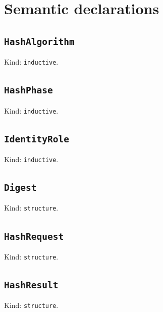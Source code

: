 \documentclass[11pt]{article}
\begin{document}
\section*{Semantic declarations}
\subsection*{\texttt{HashAlgorithm}}
\noindent Kind: \texttt{inductive}.\par
\subsection*{\texttt{HashPhase}}
\noindent Kind: \texttt{inductive}.\par
\subsection*{\texttt{IdentityRole}}
\noindent Kind: \texttt{inductive}.\par
\subsection*{\texttt{Digest}}
\noindent Kind: \texttt{structure}.\par
\subsection*{\texttt{HashRequest}}
\noindent Kind: \texttt{structure}.\par
\subsection*{\texttt{HashResult}}
\noindent Kind: \texttt{structure}.\par
\end{document}
